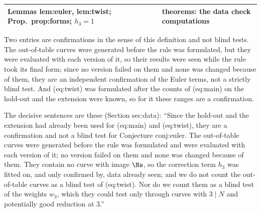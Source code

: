 \begin{sloppypar}
\begin{remark}
\begin{center}
\begin{tabular}{p{2.6cm}p{2.1cm}p{2.3cm}p{1.7cm}p{4.6cm}}
Lemmas lem:euler, lem:twist; Prop.\ prop:forms; $h_3=1$ & & & & theorems: the data check computations\\
\bottomrule
\end{tabular}
\end{center}
Two entries are confirmations in the sense of this definition and not blind tests. The out-of-table curves were generated before the rule was
formulated, but they were evaluated with each version of it, so their results were seen while the rule took its final form; since no version
failed on them and none was changed because of them, they are an independent confirmation of the Euler terms, not a strictly blind test. And
(eq:twist) was formulated after the counts of (eq:main) on the hold-out and the extension were known, so for it these ranges are a confirmation.
\end{remark}

The decisive sentences are these (Section sec:data): ``Since the hold-out and the extension had already been used for (eq:main) and (eq:twist),
they are a confirmation and not a blind test for Conjecture conj:euler. The out-of-table curves were generated before the rule was formulated
and were evaluated with each version of it; no version failed on them and none was changed because of them. They contain no curve with image $\Ns$, so the correction term $h_3$ was fitted on, and only confirmed by, data already seen; and we do not count
the out-of-table curves as a blind test of (eq:twist). Nor do we count them as a blind test of the weights $w_3$, which they could test only
through curves with $3\mid N$ and potentially good reduction at $3$.''


\end{sloppypar}
